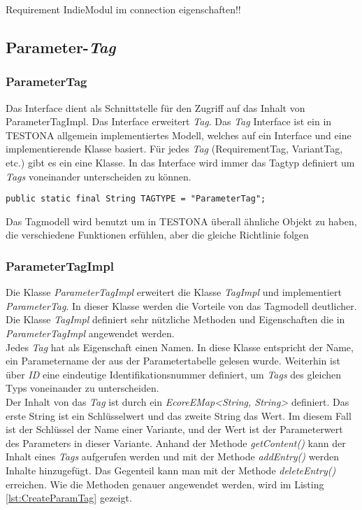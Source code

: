 Requirement IndieModul im connection eigenschaften!!\\


\subsection{Parameter-\textit{Tag}}\label{sub.ParameterTag}
\subsubsection{ParameterTag}
Das Interface dient als Schnittstelle für den Zugriff auf das Inhalt von ParameterTagImpl. Das Interface erweitert \textit{Tag}. Das \textit{Tag} Interface ist ein in TESTONA allgemein implementiertes Modell, welches auf ein Interface und eine implementierende Klasse basiert. Für jedes \textit{Tag} (RequirementTag, VariantTag, etc.) gibt es ein eine Klasse. In das Interface wird immer das Tagtyp definiert um \textit{Tags} voneinander unterscheiden zu können.

\begin{lstlisting}[caption={ParameterTag Interface}, captionpos=b]
public static final String TAGTYPE = "ParameterTag";
\end{lstlisting}

Das Tagmodell wird benutzt um in TESTONA überall ähnliche Objekt zu haben, die verschiedene Funktionen erfühlen, aber die gleiche Richtlinie folgen

\subsubsection{ParameterTagImpl}
Die Klasse \textit{ParameterTagImpl} erweitert die Klasse \textit{TagImpl} und implementiert \textit{ParameterTag}. In dieser Klasse werden die Vorteile von das Tagmodell deutlicher. Die Klasse \textit{TagImpl} definiert sehr nützliche Methoden und Eigenschaften die in \textit{ParameterTagImpl} angewendet werden.\\

Jedes \textit{Tag} hat als Eigenschaft einen Namen. In diese Klasse entspricht der Name, ein Parametername der aus der Parametertabelle gelesen wurde. Weiterhin ist über \textit{ID} eine eindeutige Identifikationsnummer definiert, um \textit{Tags} des gleichen Typs voneinander zu unterscheiden.\\

Der Inhalt von das \textit{Tag} ist durch ein \textit{EcoreEMap<String, String>} definiert. Das erste String ist ein Schlüsselwert und das zweite String das Wert. Im diesem Fall ist der Schlüssel der Name einer Variante, und der Wert ist der Parameterwert des Parameters in dieser Variante.  Anhand der Methode \textit{getContent()} kann der Inhalt eines \textit{Tags} aufgerufen werden und mit der Methode \textit{addEntry()} werden Inhalte hinzugefügt. Das Gegenteil kann man mit der Methode \textit{deleteEntry()} erreichen. Wie die Methoden genauer angewendet werden, wird im Listing \ref{lst:CreateParamTag} gezeigt.



